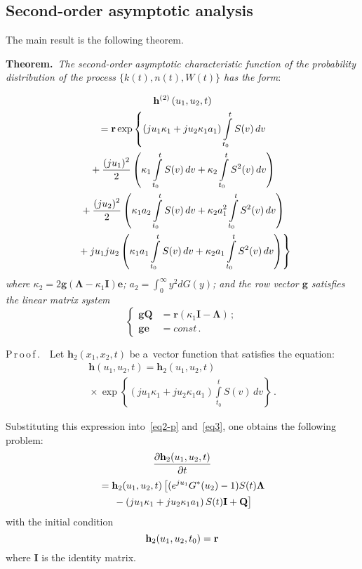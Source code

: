 \begin{multicols}{2}
\subsection{Second-order asymptotic analysis}

\noindent
The main result is the following theorem.

\smallskip

\noindent
\textbf{Theorem.}\ 
\textit{The second-order asymptotic characteristic function of the 
probability distribution of the process  $\{k(t),n(t),W(t)\}$ has the form}:

\noindent
\begin{multline*}
\mathbf{h}^{(2)}\left(u_1,u_2,t\right)\\
{}=\mathbf{r}\exp\left\{ 
\left(ju_1\kappa_1+ju_2\kappa_1a_1\right)\int\limits_{t_0}^tS(v)\,dv\right.
\\
{}+\displaystyle\frac{\displaystyle (ju_1)^2\mathstrut}{\displaystyle 2\mathstrut}\left(\kappa_1\int\limits_{t_0}^tS(v)\,dv+
\kappa_2\int\limits_{t_0}^tS^2(v)\,dv\right)
\\
{}+\displaystyle\frac{\displaystyle (ju_2)^2\mathstrut}{\displaystyle 2\mathstrut}\left(\kappa_1a_2\int\limits_{t_0}^tS(v)\,dv+
\kappa_2a_1^2\int\limits_{t_0}^tS^2(v)\,dv\right)
\\
\left.{}+ju_1ju_2\left(\kappa_1a_1\int\limits_{t_0}^tS(v)\,dv+
\kappa_2a_1\int\limits_{t_0}^tS^2(v)\,dv\right)\right\}\hspace*{-3.166pt}
\end{multline*}
\textit{where  $\kappa_2=2\mathbf{g}(\mathbf{\Lambda}-\kappa_1\mathbf{I})\mathbf{e}$;  
$a_2=\int\nolimits_0^\infty y^2dG(y)$;  and the row vector  $\mathbf{g}$  
satisfies the linear matrix system} 
$$
\left\{
\begin{array}{rl}
\mathbf{gQ}&=\mathbf{r}(\kappa_1\mathbf{I}-\mathbf{\Lambda})\,; \\[6pt]
\mathbf{ge}&=const\,.
\end{array}
\right.
$$



\noindent
P\,r\,o\,o\,f\,.\ \  
Let $\mathbf{h}_2(x_1,x_2,t)$ be a~vector function that satisfies the equation:
\begin{multline}
\label{eq12}
\mathbf{h}\left(u_1,u_2,t\right)=
\mathbf{h}_2\left(u_1,u_2,t\right)\\
{}\times\exp
\left\{ \!\left(ju_1\kappa_1+ju_2\kappa_1a_1\right)\int\limits_{t_0}^tS(v)\,dv\right\}\,.
\end{multline}

Substituting this expression into~\eqref{eq2-p} and~\eqref{eq3}, one obtains
the following problem:
\begin{multline}
\fr{\partial {\mathbf{h}_2(u_1,u_2,t)}}{\partial t}\\
{}=
\mathbf{h}_2(u_1,u_2,t)\left[(e^{ju_1}G^*(u_2)-1)S(t)\mathbf{\Lambda}\right.
\\
\left.{}-\left(ju_1\kappa_1+ju_2\kappa_1a_1\right)S(t)\mathbf{I}+\mathbf{Q}
\vphantom{e^{ju_1}G^*(u_2)}
\right]
\label{eq13}
\end{multline}
with the initial condition
\begin{equation}
\label{eq14}
{\bf h}_2(u_1,u_2,t_0)={\bf r}
\end{equation}
where {\bf I} is the identity matrix.


\end{multicols}
